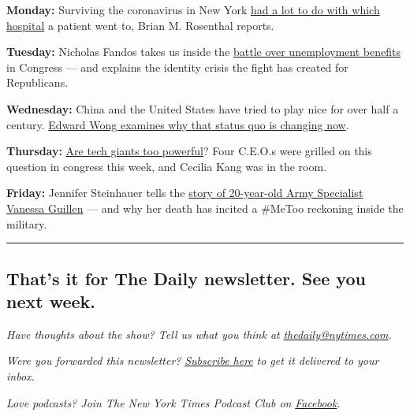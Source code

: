 \textbf{Monday:} Surviving the coronavirus in New York
\href{https://www.nytimes.com/2020/07/27/podcasts/the-daily/new-york-hospitals-covid.html}{had
a lot to do with which hospital} a patient went to, Brian M. Rosenthal
reports.

\textbf{Tuesday:} Nicholas Fandos takes us inside the
\href{https://www.nytimes.com/2020/07/28/podcasts/the-daily/unemployment-benefits-coronavirus.html}{battle
over unemployment benefits} in Congress --- and explains the identity
crisis the fight has created for Republicans.

\textbf{Wednesday:} China and the United States have tried to play nice
for over half a century.
\href{https://www.nytimes.com/2020/07/29/podcasts/the-daily/china-trump-foreign-policy.html}{Edward
Wong examines why that status quo is changing now}.

\textbf{Thursday:}
\href{https://www.nytimes.com/2020/07/30/podcasts/the-daily/congress-facebook-amazon-google-apple.html}{Are
tech giants too powerful}? Four C.E.O.s were grilled on this question in
congress this week, and Cecilia Kang was in the room.

\textbf{Friday:} Jennifer Steinhauer tells the
\href{https://www.nytimes.com/2020/07/31/podcasts/the-daily/vanessa-guillen-military-metoo.html}{story
of 20-year-old Army Specialist Vanessa Guillen} --- and why her death
has incited a \#MeToo reckoning inside the military.

\begin{center}\rule{0.5\linewidth}{\linethickness}\end{center}

\hypertarget{thats-it-for-the-daily-newsletter-see-you-next-week}{%
\subsection{That's it for The Daily newsletter. See you next
week.}\label{thats-it-for-the-daily-newsletter-see-you-next-week}}

\emph{Have thoughts about the show? Tell us what you think at}
\href{mailto:thedaily@nytimes.com?subject=The\%20Daily\%20newsletter}{\emph{thedaily@nytimes.com}}\emph{.}

\emph{Were you forwarded this newsletter?}
\href{https://www.nytimes.com/newsletters/the-daily?te=1\&nl=the-daily\&emc=edit_dy_20190627}{\emph{Subscribe
here}} \emph{to get it delivered to your inbox.}

\emph{Love podcasts? Join The New York Times Podcast Club on}
\href{https://www.facebook.com/groups/nytpodcastclub}{\emph{Facebook}}\emph{.}

